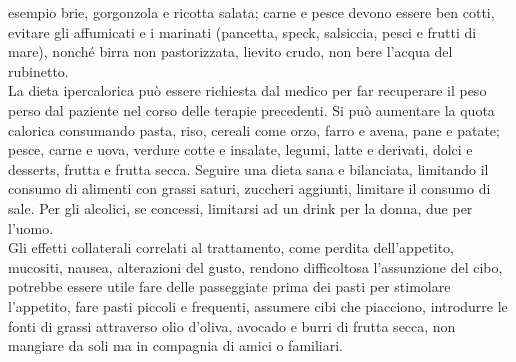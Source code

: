 esempio brie, gorgonzola e ricotta salata; carne e pesce devono essere ben cotti, evitare gli affumicati e i 
marinati (pancetta, speck, salsiccia, pesci e frutti di mare), nonché birra non pastorizzata, lievito crudo, 
non bere l’acqua del rubinetto\cite{DIETA}.\\
La dieta ipercalorica può essere richiesta dal medico per far recuperare il peso perso dal paziente nel corso delle 
terapie precedenti. Si può aumentare la quota calorica consumando pasta, riso, cereali come orzo, farro e avena, 
pane e patate; pesce, carne e uova, verdure cotte e insalate, legumi, latte e derivati, dolci e desserts, 
frutta e frutta secca\cite{DIETA}. Seguire una dieta sana e bilanciata, limitando il consumo di alimenti con grassi 
saturi, zuccheri aggiunti, limitare il consumo di sale. Per gli alcolici, se concessi, 
limitarsi ad un drink per la donna, due per l’uomo\cite{LLSNUTRITION}.\\
Gli effetti collaterali correlati al trattamento, come perdita dell’appetito, mucositi, nausea, alterazioni del 
gusto, rendono difficoltosa l’assunzione del cibo, potrebbe essere utile fare delle passeggiate prima dei pasti per 
stimolare l’appetito, fare pasti piccoli e frequenti, assumere cibi che piacciono, introdurre le fonti di grassi 
attraverso olio d’oliva, avocado e burri di frutta secca, non mangiare da soli ma in compagnia di 
amici o familiari\cite{LLSNUTRITION}.\\

